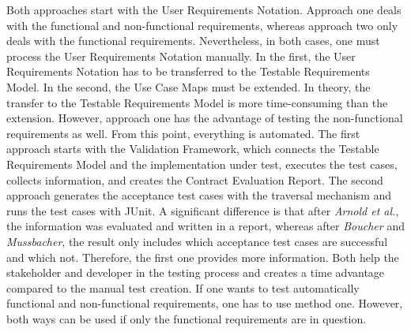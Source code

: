 Both approaches start with the User Requirements Notation. Approach one deals with the functional and non-functional requirements, whereas approach two only deals with the functional requirements. Nevertheless, in both cases, one must process the User Requirements Notation manually. In the first, the User Requirements Notation has to be transferred to the Testable Requirements Model. In the second, the Use Case Maps must be extended. In theory, the transfer to the Testable Requirements Model is more time-consuming than the extension. However, approach one has the advantage of testing the non-functional requirements as well. From this point, everything is automated. The first approach starts with the Validation Framework, which connects the Testable Requirements Model and the implementation under test, executes the test cases, collects information, and creates the Contract Evaluation Report. The second approach generates the acceptance test cases with the traversal mechanism and runs the test cases with JUnit. A significant difference is that after \textit{Arnold et al.}, the information was evaluated and written in a report, whereas after \textit{Boucher} and \textit{Mussbacher}, the result only includes which acceptance test cases are successful and which not. Therefore, the first one provides more information. Both help the stakeholder and developer in the testing process and creates a time advantage compared to the manual test creation. If one wants to test automatically functional and non-functional requirements, one has to use method one. However, both ways can be used if only the functional requirements are in question.

